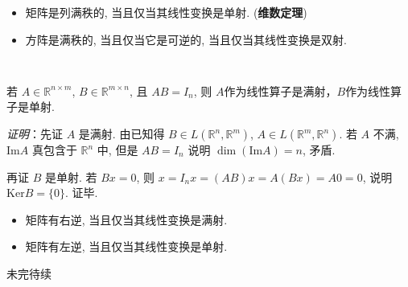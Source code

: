 \begin{itemize}
\item 矩阵是列满秩的, 当且仅当其线性变换是单射. (\textbf{维数定理})
\end{itemize}

\begin{itemize}
\item 方阵是满秩的, 当且仅当它是可逆的, 当且仅当其线性变换是双射. \end{itemize}
\verb| |

\begin{theorem}{}
若 $A\in\mathbb{R}^{n\times m}$, $B\in\mathbb{R}^{m\times n}$, 且 $AB=I_n$, 则 $A$作为线性算子是满射，$B$作为线性算子是单射.

\textsl{证明}：先证 $A$ 是满射. 由已知得 $B\in L(\mathbb{R}^{n},\mathbb{R}^{m})$, $A\in L(\mathbb{R}^{m},\mathbb{R}^{n})$.
若 $A$ 不满, $\mathrm{Im}A$ 真包含于 $\mathbb{R}^{n}$ 中, 但是 $AB=I_{n}$
说明 $\dim(\mathrm{Im}A)=n$, 矛盾. 

再证 $B$ 是单射. 若 $Bx=0$, 则 $x=I_{n}x=(AB)x=A(Bx)=A0=0$, 说明 $\mathrm{Ker}B=\{0\}$.
证毕. 
\end{theorem}



\begin{itemize}
\item 矩阵有右逆, 当且仅当其线性变换是满射. \end{itemize}

\begin{itemize}
\item 矩阵有左逆, 当且仅当其线性变换是单射. 
\end{itemize}

未完待续
